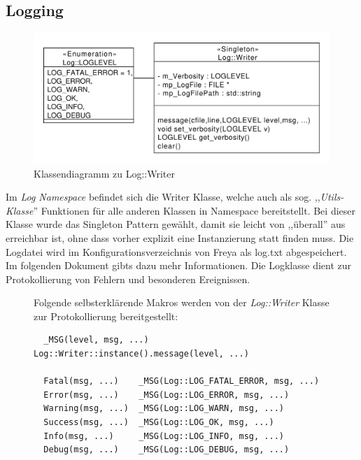 \subsection{Logging}
\begin{figure}[htb!]
    \centering
    \includegraphics[scale=0.6]{./gfx/class/log}
    \caption{Klassendiagramm zu Log::Writer}
    \label{c_log}
\end{figure}
Im \emph{Log Namespace} befindet sich die Writer Klasse, welche auch als sog. ,,\textit{Utils-Klasse}'' Funktionen für alle anderen
Klassen in Namespace bereitstellt. Bei dieser Klasse wurde das Singleton Pattern gewählt, damit sie leicht von ,,überall'' aus erreichbar ist, ohne dass vorher explizit eine Instanzierung statt finden muss. Die Logdatei wird im Konfigurationsverzeichnis von Freya als log.txt
abgespeichert. Im folgenden Dokument gibts dazu mehr Informationen. 
Die Logklasse dient zur Protokollierung von Fehlern und besonderen Ereignissen.  

\begin{figure}[htb!]
    Folgende selbsterklärende Makros werden von der \emph{Log::Writer} Klasse zur Protokollierung bereitgestellt:

  \begin{verbatim}
  _MSG(level, msg, ...) Log::Writer::instance().message(level, ...)

  Fatal(msg, ...)    _MSG(Log::LOG_FATAL_ERROR, msg, ...)
  Error(msg, ...)    _MSG(Log::LOG_ERROR, msg, ...)
  Warning(msg, ...)  _MSG(Log::LOG_WARN, msg, ...)
  Success(msg, ...)  _MSG(Log::LOG_OK, msg, ...)
  Info(msg, ...)     _MSG(Log::LOG_INFO, msg, ...)
  Debug(msg, ...)    _MSG(Log::LOG_DEBUG, msg, ...)
  \end{verbatim}
\end{figure}

